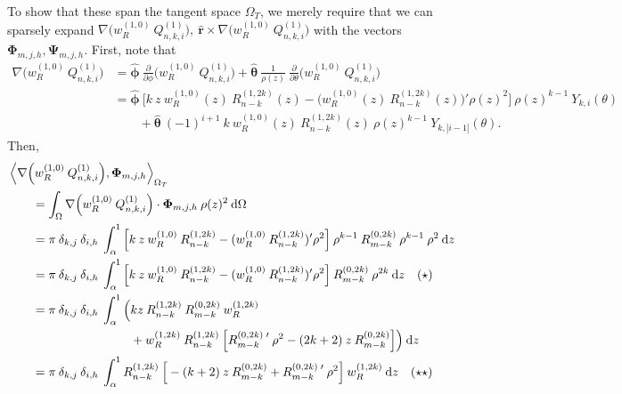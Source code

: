 \documentclass[11pt, oneside]{article}   	%
\newcommand{\genjac}{R}
\newcommand{\genjacnmk}{\genjac_{n-k}}
\newcommand{\genjacw}{w_\genjac}
\newcommand{\scop}{Q}
\newcommand{\scopnki}{\scop_{n,k,i}}
\newcommand{\ch}{Y}
\newcommand{\chki}{\ch_{k,i}}
\newcommand{\ppphi}{\frac{\partial}{\partial \phi}}
\newcommand{\pptheta}{\frac{\partial}{\partial \theta}}
\newcommand{\tangentspace}{{\Omega_T}}
\newcommand{\phivec}{\hat{\bm{\phi}}}
\newcommand{\thetavec}{\hat{\bm{\theta}}}
\newcommand{\tsopi}{\bm{\Phi}}
\newcommand{\tsopii}{\bm{\Psi}}
\newcommand{\rvec}{\hat{\bm{r}}}
\begin{document}
To show that these span the tangent space $\tangentspace$, we merely require that we can sparsely expand $\nabla \Big( \genjacw^{(1,0)} \: \scopnki^{(1)} \Big), \: \rvec \times \nabla \Big( \genjacw^{(1,0)} \: \scopnki^{(1)} \Big)$ with the vectors $\tsopi_{m,j,h}, \tsopii_{m,j,h}$.  First, note that
\begin{align*}
	\nabla \Big( \genjacw^{(1,0)} \: \scopnki^{(1)} \Big) &= \phivec \: \ppphi \Big( \genjacw^{(1,0)} \: \scopnki^{(1)} \Big) + \thetavec \: \frac{1}{\rho(z)} \: \pptheta \Big( \genjacw^{(1,0)} \: \scopnki^{(1)} \Big) \\
	&= \phivec \: \Big[k \: z \: \genjacw^{(1,0)}(z) \: \genjacnmk^{(1,2k)}(z) -  \big(\genjacw^{(1,0)}(z) \: \genjacnmk^{(1,2k)}(z) \big)' \rho(z)^2 \Big] \: \rho(z)^{k-1} \: \chki(\theta) \\
	&\quad \quad + \thetavec \: (-1)^{i+1} \: k \: \genjacw^{(1,0)}(z) \: \genjacnmk^{(1,2k)}(z) \: \rho(z)^{k-1} \: \ch_{k,|i-1|}(\theta).
\end{align*}
Then,
\begin{align*}
	&\ip<\nabla \Big( \genjacw^{(1,0)} \: \scopnki^{(1)} \Big), \tsopi_{m,j,h}>_\tangentspace \\
	&\quad \quad = \int_\Omega \nabla \Big( \genjacw^{(1,0)} \: \scopnki^{(1)} \Big) \cdot \tsopi_{m,j,h} \: \rho(z)^2 \:\D \Omega \\
	&\quad \quad = \pi \: \delta_{k,j} \: \delta_{i,h} \: \int_\alpha^1 \Big[k \: z \: \genjacw^{(1,0)} \: \genjacnmk^{(1,2k)} -  (\genjacw^{(1,0)} \: \genjacnmk^{(1,2k)})' \rho^2 \Big] \: \rho^{k-1} \: \genjac_{m-k}^{(0,2k)} \: \rho^{k-1} \: \rho^2 \:\D z \\
	&\quad \quad = \pi \: \delta_{k,j} \: \delta_{i,h} \: \int_\alpha^1 \Big[k \: z \: \genjacw^{(1,0)} \: \genjacnmk^{(1,2k)} -  (\genjacw^{(1,0)} \: \genjacnmk^{(1,2k)})' \rho^2 \Big] \: \genjac_{m-k}^{(0,2k)} \: \rho^{2k} \:\D z \quad (\star) \\
	&\quad \quad = \pi \: \delta_{k,j} \: \delta_{i,h} \: \int_\alpha^1 \Big( kz \: \genjacnmk^{(1,2k)} \: \genjac_{m-k}^{(0,2k)} \: \genjacw^{(1,2k)} \\
	&\quad \quad\quad \quad\quad \quad\quad \quad\quad \quad+ \genjacw^{(1,2k)} \: \genjacnmk^{(1,2k)} \: \Big[ \genjac_{m-k}^{(0,2k) \; \prime} \: \rho^2 - (2k+2) \: z \: \genjac_{m-k}^{(0,2k)} \Big] \Big) \: \D z \\
	&\quad \quad = \pi \: \delta_{k,j} \: \delta_{i,h} \: \int_\alpha^1 \genjacnmk^{(1,2k)} \: \Big[ - (k + 2) \: z \: \genjac_{m-k}^{(0,2k)} + \genjac_{m-k}^{(0,2k) \; \prime} \: \rho^2 \Big] \: \genjacw^{(1,2k)} \: \D z \quad (\star \star)
\end{align*}
\end{document}

